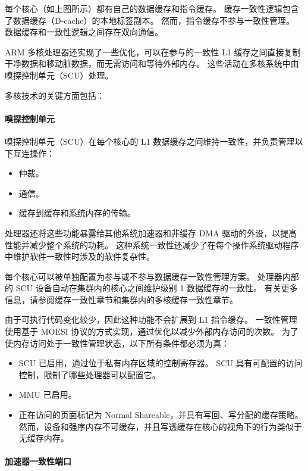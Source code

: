 
每个核心（如上图所示）都有自己的数据缓存和指令缓存。
缓存一致性逻辑包含了数据缓存（D-cache）的本地标签副本。
然而，指令缓存不参与一致性管理。
数据缓存和一致性逻辑之间存在双向通信。

ARM 多核处理器还实现了一些优化，可以在参与的一致性 L1 缓存之间直接复制干净数据和移动脏数据，而无需访问和等待外部内存。
这些活动在多核系统中由嗅探控制单元（SCU）处理。

多核技术的关键方面包括：

\paragraph*{嗅探控制单元}

嗅探控制单元（SCU）在每个核心的 L1 数据缓存之间维持一致性，并负责管理以下互连操作：

\begin{itemize}
\item
  仲裁。
\item
  通信。
\item
  缓存到缓存和系统内存的传输。
\end{itemize}

处理器还将这些功能暴露给其他系统加速器和非缓存 DMA 驱动的外设，以提高性能并减少整个系统的功耗。
这种系统一致性还减少了在每个操作系统驱动程序中维护软件一致性时涉及的软件复杂性。

每个核心可以被单独配置为参与或不参与数据缓存一致性管理方案。
处理器内部的 SCU 设备自动在集群内的核心之间维护级别 1 数据缓存的一致性。
有关更多信息，请参阅缓存一致性章节和集群内的多核缓存一致性章节。

由于可执行代码变化较少，因此这种功能不会扩展到 L1 指令缓存。
一致性管理使用基于 MOESI 协议的方式实现，通过优化以减少外部内存访问的次数。
为了使内存访问处于一致性管理状态，以下所有条件都必须为真：

\begin{itemize}
\item
  SCU 已启用，通过位于私有内存区域的控制寄存器。
  SCU 具有可配置的访问控制，限制了哪些处理器可以配置它。
\item
  MMU 已启用。
\item
  正在访问的页面标记为 Normal
  Shareable，并具有写回、写分配的缓存策略。
  然而，设备和强序内存不可缓存，并且写透缓存在核心的视角下的行为类似于无缓存内存。
\end{itemize}

\paragraph*{加速器一致性端口}


